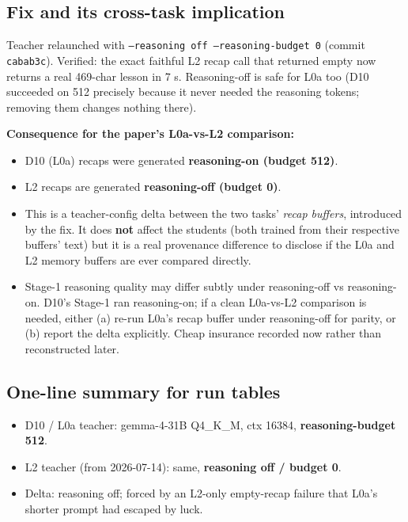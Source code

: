 \subsection*{Fix and its cross-task implication}

Teacher relaunched with \texttt{--reasoning off --reasoning-budget 0}
(commit \texttt{cabab3c}). Verified: the exact faithful L2 recap call that
returned empty now returns a real 469-char lesson in 7 s. Reasoning-off
is safe for L0a too (D10 succeeded on 512 precisely because it never
needed the reasoning tokens; removing them changes nothing there).

\textbf{Consequence for the paper's L0a-vs-L2 comparison:}
\begin{itemize}
\item D10 (L0a) recaps were generated \textbf{reasoning-on (budget 512)}.
\item L2 recaps are generated \textbf{reasoning-off (budget 0)}.
\item This is a teacher-config delta between the two tasks' \emph{recap
  buffers}, introduced by the fix. It does \textbf{not} affect the students
  (both trained from their respective buffers' text) but it is a real
  provenance difference to disclose if the L0a and L2 memory buffers
  are ever compared directly.
\item Stage-1 reasoning quality may differ subtly under reasoning-off vs
  reasoning-on. D10's Stage-1 ran reasoning-on; if a clean L0a-vs-L2
  comparison is needed, either (a) re-run L0a's recap buffer under
  reasoning-off for parity, or (b) report the delta explicitly. Cheap
  insurance recorded now rather than reconstructed later.
\end{itemize}

\subsection*{One-line summary for run tables}

\begin{itemize}
\item D10 / L0a teacher: gemma-4-31B Q4\_K\_M, ctx 16384, \textbf{reasoning-budget 512}.
\item L2 teacher (from 2026-07-14): same, \textbf{reasoning off / budget 0}.
\item Delta: reasoning off; forced by an L2-only empty-recap failure that
  L0a's shorter prompt had escaped by luck.
\end{itemize}
